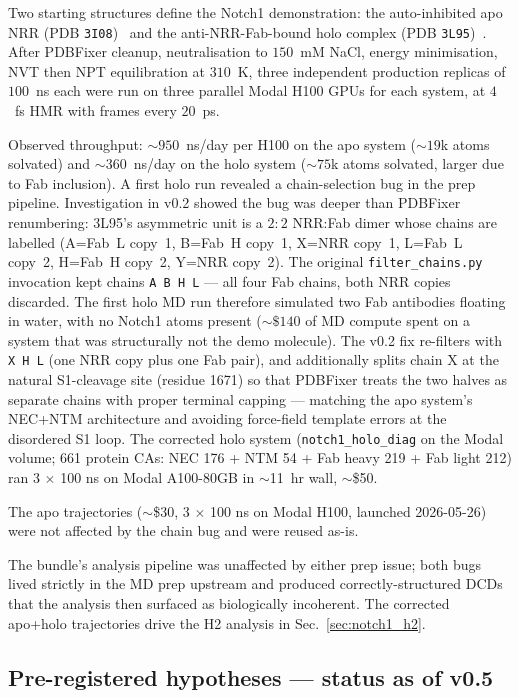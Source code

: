 \documentclass[11pt]{article}
\begin{document}
Two starting structures define the Notch1 demonstration: the
auto-inhibited apo NRR (PDB \texttt{3I08})~\cite{gordon2007nrr} and
the anti-NRR-Fab-bound holo complex (PDB
\texttt{3L95})~\cite{wu2010antinrr}. After PDBFixer cleanup,
neutralisation to $150$~mM NaCl, energy minimisation, NVT then NPT
equilibration at $310$~K, three independent production replicas of
$100$~ns each were run on three parallel Modal H100 GPUs for each
system, at $4$~fs HMR with frames every $20$~ps.

Observed throughput: $\sim\!950$~ns/day per H100 on the apo system
($\sim\!19$k atoms solvated) and $\sim\!360$~ns/day on the holo
system ($\sim\!75$k atoms solvated, larger due to Fab inclusion).
A first holo run revealed a chain-selection bug in the prep
pipeline. Investigation in v0.2 showed the bug was deeper than
PDBFixer renumbering: 3L95's asymmetric unit is a
$2{:}2$ NRR{:}Fab dimer whose chains are labelled (A=Fab~L
copy~1, B=Fab~H copy~1, X=NRR copy~1, L=Fab~L copy~2, H=Fab~H copy~2,
Y=NRR copy~2). The original \texttt{filter\_chains.py} invocation
kept chains \texttt{A B H L} --- all four Fab chains, both NRR copies
discarded. The first holo MD run therefore simulated two Fab
antibodies floating in water, with no Notch1 atoms present
($\sim\!\$140$ of MD compute spent on a system that was structurally
not the demo molecule). The v0.2 fix re-filters with \texttt{X H L}
(one NRR copy plus one Fab pair), and additionally splits chain X at
the natural S1-cleavage site (residue 1671) so that PDBFixer treats
the two halves as separate chains with proper terminal capping ---
matching the apo system's NEC+NTM architecture and avoiding force-field
template errors at the disordered S1 loop. The corrected holo system
(\texttt{notch1\_holo\_diag} on the Modal volume; 661 protein CAs:
NEC 176 + NTM 54 + Fab heavy 219 + Fab light 212) ran 3 $\times$
100 ns on Modal A100-80GB in $\sim$11~hr wall, $\sim$\$50.

The apo trajectories ($\sim$\$30, 3 $\times$ 100 ns on Modal H100,
launched 2026-05-26) were not affected by the chain bug and were
reused as-is.

The bundle's analysis pipeline was unaffected by either prep issue;
both bugs lived strictly in the MD prep upstream and produced
correctly-structured DCDs that the analysis then surfaced as
biologically incoherent. The corrected apo+holo trajectories drive
the H2 analysis in Sec.~\ref{sec:notch1_h2}.

\subsection{Pre-registered hypotheses --- status as of v0.5}
\label{sec:hypotheses}
\end{document}
